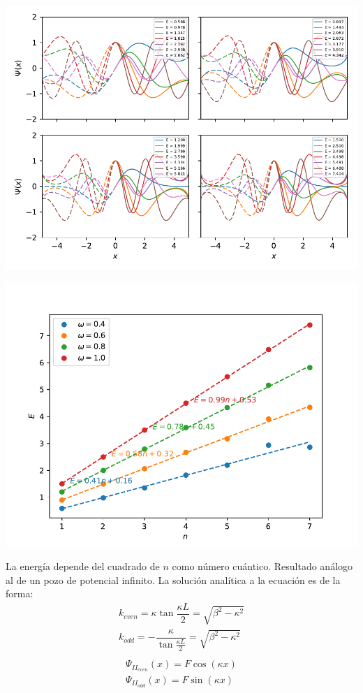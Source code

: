 \documentclass[paper=letter, fontsize=11pt]{scrartcl}
\begin{document}
\newpage


\begin{center}
	\includegraphics[width=\linewidth]{plot.pdf}
\end{center}
\begin{center}
	\includegraphics[width=\linewidth]{energies.pdf}
\end{center}

La energ\'ia depende del cuadrado de $n$ como n\'umero cu\'antico. Resultado an\'alogo al de un pozo de potencial infinito. La soluci\'on anal\'itica a la ecuaci\'on es de la forma:
\begin{equation}
\begin{array}{c}
k_{even} = \kappa\tan\dfrac{\kappa L}{2} = \sqrt{\beta^2 - \kappa^2} \\
k_{odd} = -\dfrac{\kappa}{\tan\frac{\kappa L}{2}} = \sqrt{\beta^2 - \kappa^2}\\
\end{array}
\end{equation}
\begin{equation}
\begin{array}{c}
\Psi_{II_{even}}(x) = F\cos(\kappa x)\\
\Psi_{II_{odd}}(x) = F\sin(\kappa x)
\end{array}
\end{equation}
\end{document}
